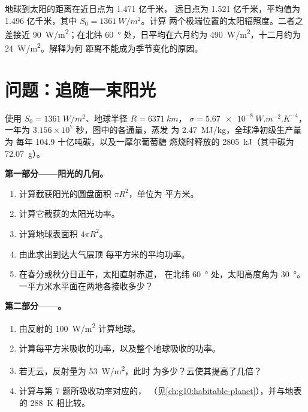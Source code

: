 \begin{exercise}[$\star\star\star$]\label{exo:g10:earth-energy-budget:15}
地球到太阳的距离在近日点为 1.471 亿千米，
远日点为 1.521 亿千米，平均值为
1.496 亿千米，其中 $S_0 = \qty{1361}{W/m^2}$。计算
两个极端位置的太阳辐照度。二者之差接近
\qty{90}{W/m^2}；在北纬 \qty{60}{\degree} 处，日平均在六月约为
\qty{490}{W/m^2}，十二月约为 \qty{24}{W/m^2}。解释为何
距离不能成为季节变化的原因。
\end{exercise}

\section{问题：追随一束阳光}

\begin{problem}
\label{pb:g10:earth-energy-budget:1}
使用 $S_0 = \qty{1361}{W/m^2}$、地球半径 $R = \qty{6371}{km}$，
$\sigma = \qty{5.67e-8}{W.m^{-2}.K^{-4}}$，一年为 $3.156\times10^7$
秒，图中的各通量，蒸发
为 \qty{2.47}{MJ/kg}，全球净初级生产量为
每年 \num{104.9} 十亿吨碳，以及一摩尔葡萄糖
燃烧时释放的 \qty{2805}{kJ}（其中碳为 \qty{72.07}{g}）。

\medskip
\noindent\textbf{第一部分——阳光的几何。}
\begin{enumerate}
  \item 计算截获阳光的圆盘面积 $\pi R^2$，单位为
        平方米。
  \item 计算它截获的太阳光功率。
  \item 计算地球表面积 $4\pi R^2$。
  \item 由此求出到达大气层顶
        每平方米的平均功率。
  \item 在春分或秋分日正午，太阳直射赤道，
        在北纬 \qty{60}{\degree} 处，太阳高度角为 \qty{30}{\degree}。
        一平方米水平面在两地各接收多少？
\end{enumerate}

\medskip
\noindent\textbf{第二部分——。}
\begin{enumerate}[resume]
  \item 由反射的 \qty{100}{W/m^2} 计算地球。
  \item 计算每平方米吸收的功率，以及整个地球吸收的功率。
  \item 若无云，反射量为 \qty{53}{W/m^2}，此时
        为多少？云使其提高了几倍？
  \item 计算与第 7 题所吸收功率对应的，
        （见\cref{ch:g10:habitable-planet}），并与地表
        的 \qty{288}{K} 相比较。
\end{enumerate}


\end{problem}
